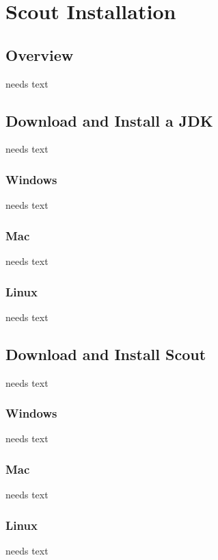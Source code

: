 \documentclass[a4paper,10pt,twoside]{book}
\begin{document}
  \sloppy
\fi


\chapter{Scout Installation}

\section{Overview}
needs text

\section{Download and Install a JDK}
needs text

\subsection{Windows}
needs text

\subsection{Mac}
needs text

\subsection{Linux}
needs text

\section{Download and Install Scout}
needs text

\subsection{Windows}
needs text

\subsection{Mac}
needs text

\subsection{Linux}
needs text
\end{document}
